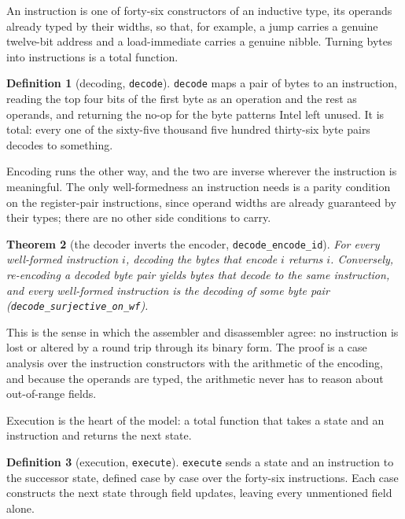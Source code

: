 \documentclass[11pt]{amsart}
\theoremstyle{plain}
\newtheorem{theorem}{Theorem}[section]
\theoremstyle{definition}
\newtheorem{definition}[theorem]{Definition}
\newcommand{\code}[1]{\texttt{#1}}
\begin{document}
An instruction is one of forty-six constructors of an inductive type, its operands already typed by their widths, so that, for example, a jump carries a genuine twelve-bit address and a load-immediate carries a genuine nibble. Turning bytes into instructions is a total function.

\begin{definition}[decoding, \code{decode}]\label{def:decode}
\code{decode} maps a pair of bytes to an instruction, reading the top four bits of the first byte as an operation and the rest as operands, and returning the no-op for the byte patterns Intel left unused. It is total: every one of the sixty-five thousand five hundred thirty-six byte pairs decodes to something.
\end{definition}

Encoding runs the other way, and the two are inverse wherever the instruction is meaningful. The only well-formedness an instruction needs is a parity condition on the register-pair instructions, since operand widths are already guaranteed by their types; there are no other side conditions to carry.

\begin{theorem}[the decoder inverts the encoder, \code{decode\_encode\_id}]\label{thm:bijection}
For every well-formed instruction $i$, decoding the bytes that encode $i$ returns $i$. Conversely, re-encoding a decoded byte pair yields bytes that decode to the same instruction, and every well-formed instruction is the decoding of some byte pair (\code{decode\_surjective\_on\_wf}).
\end{theorem}

This is the sense in which the assembler and disassembler agree: no instruction is lost or altered by a round trip through its binary form. The proof is a case analysis over the instruction constructors with the arithmetic of the encoding, and because the operands are typed, the arithmetic never has to reason about out-of-range fields.

Execution is the heart of the model: a total function that takes a state and an instruction and returns the next state.

\begin{definition}[execution, \code{execute}]\label{def:execute}
\code{execute} sends a state and an instruction to the successor state, defined case by case over the forty-six instructions. Each case constructs the next state through field updates, leaving every unmentioned field alone.
\end{definition}
\end{document}
